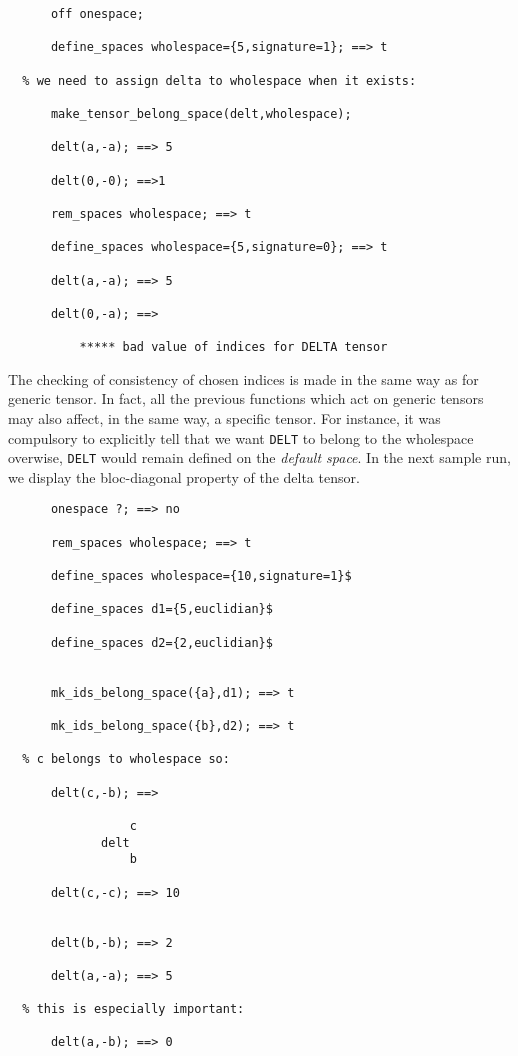 \begin{verbatim}
      off onespace;

      define_spaces wholespace={5,signature=1}; ==> t

  % we need to assign delta to wholespace when it exists:
      
      make_tensor_belong_space(delt,wholespace);

      delt(a,-a); ==> 5

      delt(0,-0); ==>1

      rem_spaces wholespace; ==> t

      define_spaces wholespace={5,signature=0}; ==> t

      delt(a,-a); ==> 5

      delt(0,-a); ==> 

          ***** bad value of indices for DELTA tensor

\end{verbatim}
The checking of consistency of chosen indices is made in the same way as for 
generic tensor. In fact, all the previous functions which act on generic tensors
may also affect, in the same way, a specific tensor. For instance, it was 
compulsory to explicitly tell that we want \texttt{DELT} to belong to the 
wholespace   overwise, 
\texttt{DELT} would remain defined on the \emph{default space}.
In the next sample run,  we display the bloc-diagonal property of 
the  delta tensor.
\begin{verbatim}
      onespace ?; ==> no

      rem_spaces wholespace; ==> t

      define_spaces wholespace={10,signature=1}$

      define_spaces d1={5,euclidian}$
 
      define_spaces d2={2,euclidian}$


      mk_ids_belong_space({a},d1); ==> t

      mk_ids_belong_space({b},d2); ==> t

  % c belongs to wholespace so:

      delt(c,-b); ==>

                 c
             delt
                 b

      delt(c,-c); ==> 10


      delt(b,-b); ==> 2

      delt(a,-a); ==> 5

  % this is especially important:

      delt(a,-b); ==> 0
\end{verbatim}
